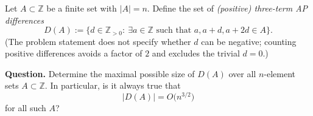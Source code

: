 \smallskip
\noindent
Let $A\subset\mathbb{Z}$ be a finite set with $|A|=n$. Define the set of \emph{(positive) three-term AP differences}
\[
D(A):=\{d\in\mathbb{Z}_{>0}:\ \exists a\in\mathbb{Z}\text{ such that }a,a+d,a+2d\in A\}.
\]
(The problem statement does not specify whether $d$ can be negative; counting positive differences avoids a factor of $2$ and excludes the trivial $d=0$.)

\smallskip
\noindent
\textbf{Question.}
Determine the maximal possible size of $D(A)$ over all $n$-element sets $A\subset\mathbb{Z}$. In particular, is it always true that
\[
|D(A)|=O\bigl(n^{3/2}\bigr)
\]
for all such $A$?
